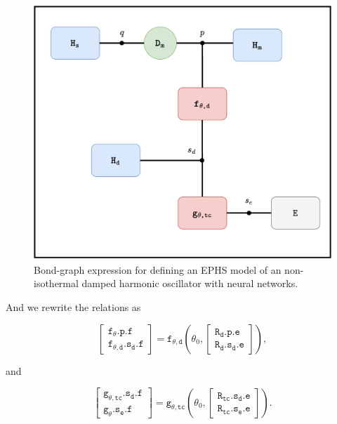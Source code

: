 \documentclass[
	parskip, 			   %
	twoside, 			   %
	DIV=14, 			   %
	BCOR=15.0mm, 		   %
	headsepline, 		   %
	open=right, 		   %
	captions=tableheading, %
	bibliography=totoc,    %
	numbers=noenddot       %
]{scrreprt}
\begin{document}
\begin{figure}[h!]
    \centering
    \includegraphics[scale=0.6]{figures/bondgraph_ndho_exergetic_NN.pdf}
    \caption{Bond-graph expression for defining an EPHS model of an non-isothermal damped harmonic oscillator with neural networks.}
    \label{fig:bondgraph_ndho_exergetic_NN}
\end{figure}

And we rewrite the relations as

\begin{equation}
    \label{eq:resistive_structure_damping_interconnection_NN_ndho}
    \left[\begin{array}{l}\mathtt{f_{\theta}.p.f} \\ \mathtt{f_{\theta, d}.s_{d}.f}\end{array}\right]=\mathtt{f_{\theta,d}} \left(\theta_0, 
    \left[\begin{array}{l}\mathtt{R_{d}.p.e} \\ \mathtt{R_{d}.s_{d}.e}\end{array}\right] \right),
\end{equation}

and

\begin{equation}
    \label{eq:resistive_structure_thermal_conduction_interconnection_NN_ndho}
    \left[\begin{array}{l}\mathtt{g_{\theta, tc}.s_{d}.f} \\ \mathtt{g_{\theta}.s_{e}.f}\end{array}\right]=\mathtt{g_{\theta,tc}} \left(\theta_0, 
    \left[\begin{array}{l} \mathtt{R_{tc}.s_{d}.e} \\ \mathtt{R_{tc}.s_{e}.e}\end{array}\right] \right).
\end{equation}
\end{document}
